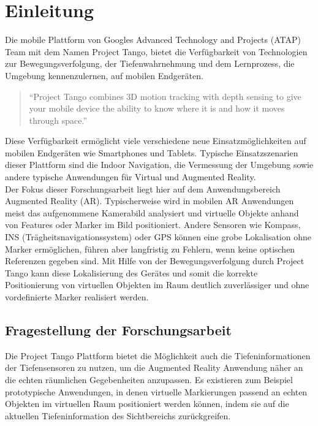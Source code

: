 \chapter{Einleitung}

Die mobile Plattform von Googles Advanced Technology and Projects (ATAP) Team mit dem Namen Project Tango, bietet die Verfügbarkeit von Technologien zur Bewegungsverfolgung, der Tiefenwahrnehmung und dem Lernprozess, die Umgebung kennenzulernen, auf mobilen Endgeräten. 

\begin{quotation}
\enquote{Project Tango combines 3D motion tracking with depth sensing to give your mobile device the ability to know where it is and how it moves through space.}  \citep{Proje19:online}
\end{quotation}

Diese Verfügbarkeit ermöglicht viele verschiedene neue Einsatzmöglichkeiten auf mobilen Endgeräten wie Smartphones und Tablets. Typische Einsatzszenarien dieser Plattform sind die Indoor Navigation, die Vermessung der Umgebung sowie andere typische Anwendungen für Virtual und Augmented Reality. \\

Der Fokus dieser Forschungsarbeit liegt hier auf dem Anwendungsbereich Augmented Reality (AR). Typischerweise wird in mobilen AR Anwendungen meist das aufgenommene Kamerabild analysiert und virtuelle Objekte anhand von Features oder Marker im Bild positioniert. Andere Sensoren wie Kompass, INS (Trägheitsnavigationssystem) oder GPS können eine grobe Lokalisation ohne Marker ermöglichen, führen aber langfristig zu Fehlern, wenn keine optischen Referenzen gegeben sind. Mit Hilfe von der Bewegungsverfolgung durch Project Tango kann diese Lokalisierung des Gerätes und somit die korrekte Positionierung von virtuellen Objekten im Raum deutlich zuverlässiger und ohne vordefinierte Marker realisiert werden. 

\section{Fragestellung der Forschungsarbeit}

Die Project Tango Plattform bietet die Möglichkeit auch die Tiefeninformationen der Tiefensensoren zu nutzen, um die Augmented Reality Anwendung näher an die echten räumlichen Gegebenheiten anzupassen. Es existieren zum Beispiel prototypische Anwendungen, in denen virtuelle Markierungen passend an echten Objekten im virtuellen Raum positioniert werden können, indem sie auf die aktuellen Tiefeninformation des Sichtbereichs zurückgreifen.\\

